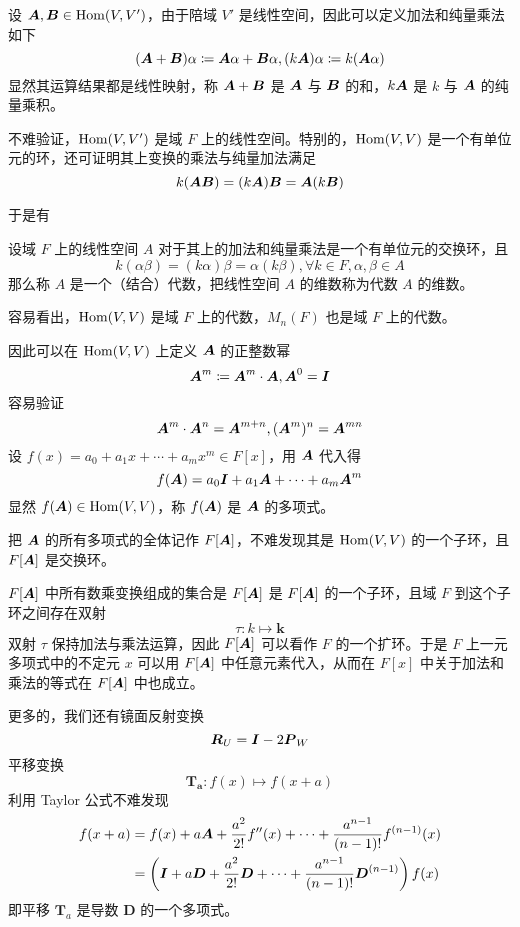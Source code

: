 设 $\boldsymbol{A},\boldsymbol{B} \in \operatorname{Hom} (V,V')$，由于陪域 $V'$ 是线性空间，因此可以定义加法和纯量乘法如下
\[ (\boldsymbol{A} + \boldsymbol{B}) \alpha \coloneqq \boldsymbol{A}\alpha + \boldsymbol{B}\alpha, (k\boldsymbol{A})\alpha \coloneqq k(\boldsymbol{A} \alpha) \]
显然其运算结果都是线性映射，称 $\boldsymbol{A} + \boldsymbol{B}$ 是 $\boldsymbol{A}$ 与 $\boldsymbol{B}$ 的和，$k\boldsymbol{A}$ 是 $k$ 与 $\boldsymbol{A}$ 的纯量乘积。

不难验证，$\operatorname{Hom}(V,V')$ 是域 $F$ 上的线性空间。特别的，$\operatorname{Hom}(V,V)$ 是一个有单位元的环，还可证明其上变换的乘法与纯量加法满足
\[ k(\boldsymbol{A}\boldsymbol{B}) = (k\boldsymbol{A})\boldsymbol{B} = \boldsymbol{A}(k\boldsymbol{B}) \]

于是有

\begin{definition}[代数]
    设域 $F$ 上的线性空间 $A$ 对于其上的加法和纯量乘法是一个有单位元的交换环，且
    \[ k(\alpha \beta) = (k\alpha)\beta = \alpha(k\beta), \forall k \in F,\alpha,\beta \in A \]
    那么称 $A$ 是一个（结合）代数，把线性空间 $A$ 的维数称为代数 $A$ 的维数。
\end{definition}

容易看出，$\operatorname{Hom}(V,V)$ 是域 $F$ 上的代数，$M_n(F)$ 也是域 $F$ 上的代数。

因此可以在 $\operatorname{Hom}(V,V)$ 上定义 $\boldsymbol{A}$ 的正整数幂
\[ \boldsymbol{A}^m \coloneqq \boldsymbol{A}^m \cdot \boldsymbol{A}, \boldsymbol{A}^0 = \boldsymbol{I} \]
容易验证
\[ \boldsymbol{A}^m \cdot \boldsymbol{A}^n = \boldsymbol{A}^{m+n}, (\boldsymbol{A}^m)^n = \boldsymbol{A}^{mn} \]
设 $f(x) = a_0 + a_1 x + \cdots + a_mx^m \in F[x]$，用 $\boldsymbol{A}$ 代入得
\[ f(\boldsymbol{A}) = a_0\boldsymbol{I} + a_1\boldsymbol{A} + \cdots + a_m \boldsymbol{A}^m \]
显然 $f(\boldsymbol{A}) \in \operatorname{Hom}(V,V)$，称 $f(\boldsymbol{A})$ 是 $\boldsymbol{A}$ 的多项式。

把 $\boldsymbol{A}$ 的所有多项式的全体记作 $F[\boldsymbol{A}]$，不难发现其是 $\operatorname{Hom}(V,V)$ 的一个子环，且 $F[\boldsymbol{A}]$ 是交换环。

$F[\boldsymbol{A}]$ 中所有数乘变换组成的集合是 $F[\boldsymbol{A}]$ 是 $F[\boldsymbol{A}]$ 的一个子环，且域 $F$ 到这个子环之间存在双射
\[ \tau : k \mapsto \boldsymbol{k} \]
双射 $\tau$ 保持加法与乘法运算，因此 $F[\boldsymbol{A}]$ 可以看作 $F$ 的一个扩环。于是 $F$ 上一元多项式中的不定元 $x$ 可以用 $F[\boldsymbol{A}]$ 中任意元素代入，从而在 $F[x]$ 中关于加法和乘法的等式在 $F[\boldsymbol{A}]$ 中也成立。

更多的，我们还有镜面反射变换
\[ \boldsymbol{R}_U = \boldsymbol{I} - 2\boldsymbol{P}_W \]
平移变换
\[ \boldsymbol{T_a} : f(x) \mapsto f(x+a) \]
利用 Taylor 公式不难发现
\begin{equation*}
    \begin{aligned}
        f(x+a) &= f(x) + a\boldsymbol{A} + \frac{a^2}{2!}f''(x) + \cdots + \frac{a^{n-1}}{(n-1)!} f^{(n-1)}(x)\\
        &= \left( \boldsymbol{I} + a\boldsymbol{D} + \frac{a^2}{2!}\boldsymbol{D} + \cdots + \frac{a^{n-1}}{(n-1)!} \boldsymbol{D}^{(n-1)} \right)f(x)
    \end{aligned}
\end{equation*}
即平移 $\boldsymbol{T}_a$ 是导数 $\boldsymbol{D}$ 的一个多项式。

